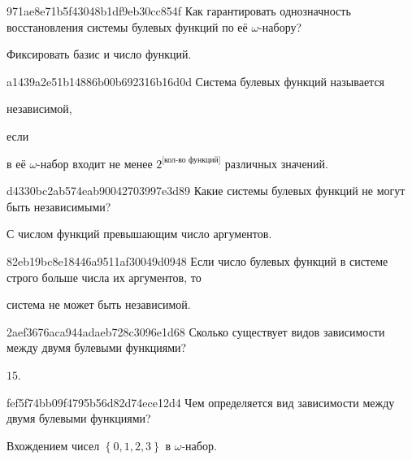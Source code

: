 \begin{note}{971ae8e71b5f43048b1df9eb30cc854f}
    Как гарантировать однозначность восстановления системы булевых функций по её \({ \omega }\)-набору?

    \begin{cloze}{1}
        Фиксировать базис и число функций.
    \end{cloze}
\end{note}

\begin{note}{a1439a2e51b14886b00b692316b16d0d}
    Система булевых функций называется \begin{icloze}{2}независимой,\end{icloze} если \begin{icloze}{1}в её \({ \omega }\)-набор входит не менее \({ 2^{\text{[кол-во функций]}} }\) различных значений.\end{icloze}
\end{note}

\begin{note}{d4330bc2ab574eab90042703997e3d89}
    Какие системы булевых функций не могут быть независимыми?

    \begin{cloze}{1}
        С числом функций превышающим число аргументов.
    \end{cloze}
\end{note}

\begin{note}{82eb19bc8e18446a9511af30049d0948}
    Если число булевых функций в системе строго больше числа их аргументов, то \begin{icloze}{1}система не может быть независимой.\end{icloze}
\end{note}

\begin{note}{2aef3676aca944adaeb728c3096e1d68}
    Сколько существует видов зависимости между двумя булевыми функциями?

    \begin{cloze}{1}
        \({ 15 }\).
    \end{cloze}
\end{note}

\begin{note}{fef5f74bb09f4795b56d82d74ece12d4}
    Чем определяется вид зависимости между двумя булевыми функциями?

    \begin{cloze}{1}
        Вхождением чисел \({ \left\{ 0, 1, 2, 3 \right\} }\) в \({ \omega }\)-набор.
    \end{cloze}
\end{note}


